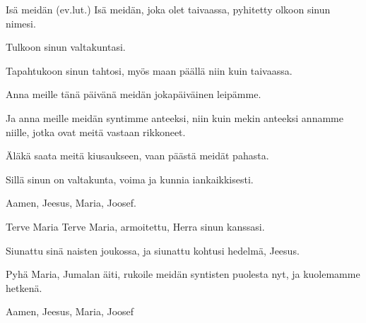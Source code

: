   \vspace{\fill}
  \hardbrk
  \vspace*{11.5ex} %
  \begin{passage}[FI]{Isä meidän {\scriptsize(ev.lut.)}}
    Isä meidän, joka olet taivaassa,
    pyhitetty olkoon sinun nimesi.
    \par
    Tulkoon sinun valtakuntasi.
    \par
    Tapahtukoon sinun tahtosi,
    myös maan päällä niin kuin taivaassa.
    \par
    Anna meille tänä päivänä
    meidän jokapäiväinen leipämme.
    \par
    Ja anna meille meidän syntimme anteeksi,
    niin kuin mekin anteeksi annamme niille,
    jotka ovat meitä vastaan rikkoneet.
    \par
    Äläkä saata meitä kiusaukseen,
    vaan päästä meidät pahasta.
    \par
    Sillä sinun on valtakunta,
    voima ja kunnia iankaikkisesti.
    \par
    Aamen, Jeesus, Maria, Joosef.
  \end{passage}
  \begin{passage}[FI]{Terve Maria}
    Terve Maria, armoitettu,
    Herra sinun kanssasi.
    \par
    Siunattu sinä naisten joukossa,
    ja siunattu kohtusi hedelmä, Jeesus.
    \par
    Pyhä Maria, Jumalan äiti, rukoile meidän
    syntisten puolesta nyt, ja kuolemamme hetkenä.
    \par
    Aamen, Jeesus, Maria, Joosef
  \end{passage}
  \vspace*{\fill}
\endsong


